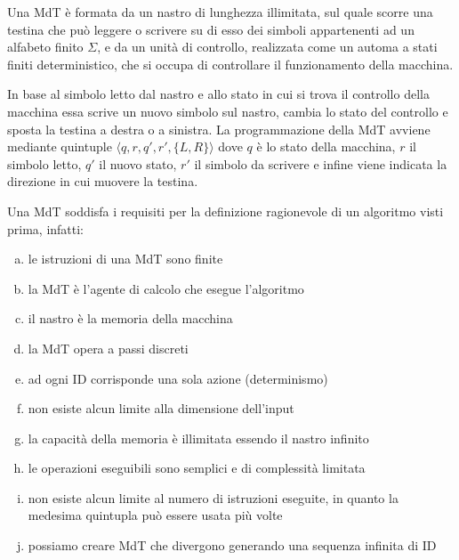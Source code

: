 \documentclass[a4paper,titlepage]{article}
\theoremstyle{definition}
\begin{document}
Una MdT è formata da un nastro di lunghezza illimitata, sul quale scorre una testina che può leggere o scrivere su di esso dei simboli appartenenti ad un alfabeto finito $\Sigma$, e da un unità di controllo, realizzata come un automa a stati finiti deterministico, che si occupa di controllare il funzionamento della macchina. 

In base al simbolo letto dal nastro e allo stato in cui si trova il controllo della macchina essa scrive un nuovo simbolo sul nastro, cambia lo stato del controllo e sposta la testina a destra o a sinistra. La programmazione della MdT avviene mediante quintuple $\langle q,r,q',r',\{L,R\}\rangle$ dove $q$ è lo stato della macchina, $r$ il simbolo letto, $q'$ il nuovo stato, $r'$ il simbolo da scrivere e infine viene indicata la direzione in cui muovere la testina. 

Una MdT soddisfa i requisiti per la definizione ragionevole di un algoritmo visti prima, infatti:
\begin{enumerate}[(a)]
	\item le istruzioni di una MdT sono finite
	\item la MdT è l'agente di calcolo che esegue l'algoritmo 
	\item il nastro è la memoria della macchina 
	\item la MdT opera a passi discreti 
	\item ad ogni ID corrisponde una sola azione (determinismo)
	\item non esiste alcun limite alla dimensione dell'input
	\item la capacità della memoria è illimitata essendo il nastro infinito 
	\item le operazioni eseguibili sono semplici e di complessità limitata 
	\item non esiste alcun limite al numero di istruzioni eseguite, in quanto la medesima quintupla può essere usata più volte
	\item possiamo creare MdT che divergono generando una sequenza infinita di ID
\end{enumerate}
\end{document}
